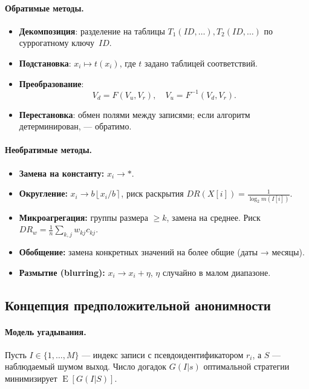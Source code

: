 \documentclass[areasetadvanced]{scrartcl}
\DeclareMathOperator{\E}{E}
\begin{document}
\paragraph{Обратимые методы.}
\begin{itemize}
  \item \textbf{Декомпозиция}: разделение на таблицы $T_1(ID,\dots), T_2(ID,\dots)$ по суррогатному ключу~$ID$.
  \item \textbf{Подстановка}: $x_i \mapsto t(x_i)$, где $t$ задано таблицей соответствий.
  \item \textbf{Преобразование}: 
    \[
      V_d = F(V_u, V_r),\quad
      V_u = F^{-1}(V_d, V_r).
    \]
  \item \textbf{Перестановка}: обмен полями между записями; если алгоритм детерминирован, — обратимо.
\end{itemize}

\paragraph{Необратимые методы.}
\begin{itemize}
  \item \textbf{Замена на константу:} $x_i\to*$.
  \item \textbf{Округление:} $x_i\to b\left\lfloor x_i/b\right\rceil$, риск раскрытия
    \(\displaystyle DR(X[i])=\frac1{\log_2 m(I[i])}\).
  \item \textbf{Микроагрегация:} группы размера $\ge k$, замена на среднее. Риск
    \(\displaystyle DR_w=\frac1n\sum_{k,j}w_{kj}c_{kj}.\)
  \item \textbf{Обобщение:} замена конкретных значений на более общие (даты → месяцы).
  \item \textbf{Размытие (blurring):} $x_i\to x_i+\eta$, $\eta$ случайно в малом диапазоне.
\end{itemize}

\subsection{Концепция предположительной анонимности}

\paragraph{Модель угадывания.}  
Пусть $I\in\{1,\dots,M\}$ — индекс записи с псевдоидентификатором $r_i$, а $S$ — наблюдаемый шумом выход.  
Число догадок $G(I|s)$ оптимальной стратегии минимизирует $\E[G(I|S)]$.
\end{document}
